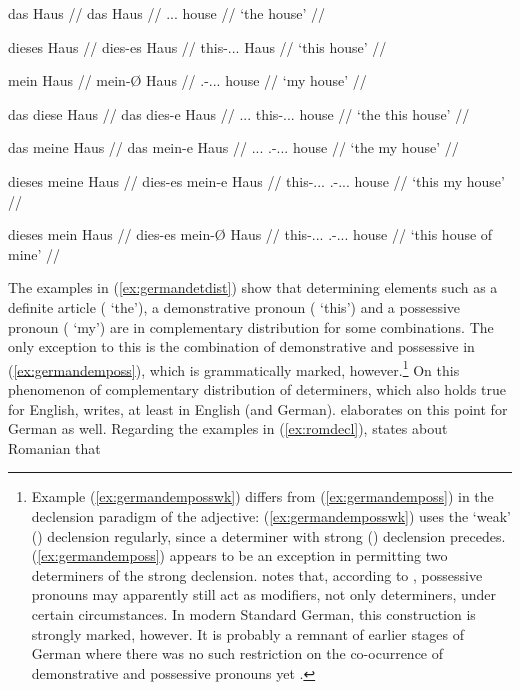 \pex\label{ex:germandetdist}
	\a{}
	\begingl
		\gla das Haus //
		\glb das Haus //
		\glc \Def{}.\Nom{}.\Sg{}.\N{} house //
		\glft `the house' //
	\endgl

	\a\begingl
		\gla dieses Haus //
		\glb dies-es Haus //
		\glc this-\Nom{}.\Sg{}.\N{}.\St{} Haus //
		\glft `this house' //
	\endgl

	\a\begingl
		\gla mein Haus //
		\glb mein-Ø Haus //
		\glc \Fsg{}.\Gen{}-\Nom{}.\Sg{}.\N{}.\St{} house //
		\glft `my house' //
	\endgl

	\a\ljudge*\begingl
		\gla das diese Haus //
		\glb das dies-e Haus //
		\glc \Def{}.\Nom{}.\Sg{}.\N{} this-\Nom{}.\Sg{}.\N{}.\Wk{} house //
		\glft `the this house' //
	\endgl

	\a\ljudge*\begingl
		\gla das meine Haus //
		\glb das mein-e Haus //
		\glc \Def{}.\Nom{}.\Sg{}.\N{} \Fsg{}.\Gen{}-\Nom{}.\Sg{}.\N{}.\Wk{} 
			house //
		\glft `the my house' //
	\endgl

	\a\ljudge*\label{ex:germandemposswk}\begingl
		\gla dieses meine Haus //
		\glb dies-es mein-e Haus //
		\glc this-\Nom{}.\Sg{}.\N{}.\St{} 
			\Fsg{}.\Gen{}-\Nom{}.\Sg{}.\N{}.\Wk{} house //
		\glft `this my house' //
	\endgl

	\a\ljudge\hash\label{ex:germandemposs}\begingl
		\gla dieses mein Haus //
		\glb dies-es mein-Ø Haus //
		\glc this-\Nom{}.\Sg{}.\N{}.\St{} 
			\Fsg{}.\Gen{}-\Nom{}.\Sg{}.\N{}.\St{} house //
		\glft `this house of mine' //
	\endgl
\xe

The examples in (\ref{ex:germandetdist}) show that determining elements such as
a definite article ( `the'), a demonstrative pronoun (
`this') and a possessive pronoun ( `my') are in complementary
distribution for some combinations. The only exception to this is the
combination of demonstrative and possessive in (\ref{ex:germandemposs}), which
is grammatically marked, however.\footnote{Example (\ref{ex:germandemposswk})
differs from (\ref{ex:germandemposs}) in the declension paradigm of the
adjective: (\ref{ex:germandemposswk}) uses the `weak' (\Wk) declension
regularly, since a determiner with strong (\St) declension precedes.
(\ref{ex:germandemposs}) appears to be an exception in permitting two
determiners of the strong declension. \citet[160--161, 203--205]{demske2001}
notes that, according to \citet{plank1992}, possessive pronouns may apparently
still act as modifiers, not only determiners, under certain circumstances. In
modern Standard German, this construction is strongly marked, however. It is
probably a remnant of earlier stages of German where there was no such
restriction on the co-ocurrence of demonstrative and possessive pronouns yet
\citep[173]{demske2001}.} On this phenomenon of complementary distribution of
determiners, which also holds true for English, \citet[208]{carnie2013} writes,
 at least in English
(and German). \citet[9--22]{demske2001} elaborates on this point for German as
well. Regarding the examples in (\ref{ex:romdecl}), \citet{dindelegan2013}
states about Romanian that


